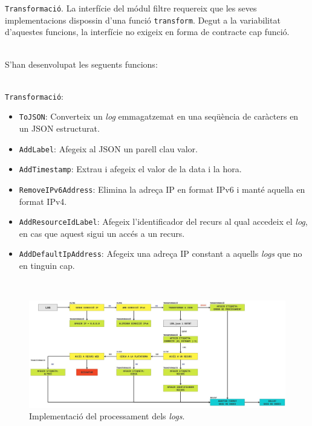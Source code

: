 \clearpage

\noindent
\texttt{Transformació}.
La interfície del módul filtre requereix que les seves implementacions dispossin d'una funció \texttt{transform}.
Degut a la variabilitat d'aquestes funcions, la interfície no exigeix en forma de contracte cap funció.

\noindent \\
S'han desenvolupat les seguents funcions:

\noindent \\
\texttt{Transformació}:
\begin{itemize}
    \item \texttt{ToJSON}: Converteix un \textit{log} emmagatzemat en una seqüència de caràcters en un \gls{JSON} estructurat.
    \item \texttt{AddLabel}: Afegeix al JSON un parell clau valor.
    \item \texttt{AddTimestamp}: Extrau i afegeix el valor de la data i la hora.
    \item \texttt{RemoveIPv6Address}: Elimina la adreça \gls{IP} en format IPv6 i manté aquella en format IPv4.
    \item \texttt{AddResourceIdLabel}: Afegeix l'identificador del recurs al qual accedeix el \textit{log}, en cas que aquest sigui un accés a un recurs.
    \item \texttt{AddDefaultIpAddress}: Afegeix una adreça \gls{IP} constant a aquells \textit{logs} que no en tinguin cap.
\end{itemize}

\noindent \\
\begin{figure}[htbp]
    \centerline{\includegraphics[width=1.3\textwidth]{figures/log-processing-workflow}}
    \captionsetup{justification=centering}
    \caption{Implementació del processament dels \textit{logs}.}\label{fig:log-processing-workflow}
\end{figure}